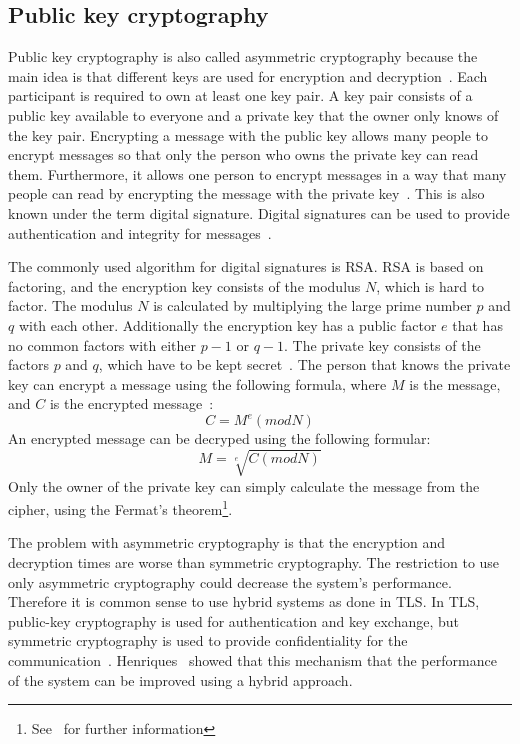 \subsection{Public key cryptography}
Public key cryptography is also called asymmetric cryptography because the main idea is that different keys are used for encryption and decryption~\cite{anderson2020security}.
Each participant is required to own at least one key pair.
A key pair consists of a public key available to everyone and a private key that the owner only knows of the key pair.
Encrypting a message with the public key allows many people to encrypt messages so that only the person who owns the private key can read them.
Furthermore, it allows one person to encrypt messages in a way that many people can read by encrypting the message with the private key~\cite{henriques2017using}.
This is also known under the term digital signature. 
Digital signatures can be used to provide authentication and integrity for messages~\cite{anderson2020security}.

The commonly used algorithm for digital signatures is RSA.
RSA is based on factoring, and the encryption key consists of the modulus $N$, which is hard to factor.
The modulus $N$ is calculated by multiplying the large prime number $p$ and $q$ with each other.
Additionally the encryption key has a public factor $e$ that has no common factors with either $p-1$ or $q-1$.
The private key consists of the factors $p$ and $q$, which have to be kept secret~\cite{anderson2020security}.
The person that knows the private key can encrypt a message using the following formula, where $M$ is the message, and $C$ is the encrypted message~\cite{anderson2020security}:
\begin{displaymath}
	C = M^e (mod N)
\end{displaymath}
An encrypted message can be decryped using the following formular:
\begin{displaymath}
	M = \sqrt[e]{C (mod N)}
\end{displaymath}
Only the owner of the private key can simply calculate the message from the cipher, using the Fermat's theorem\footnote{See~\cite{anderson2020security} for further information}.

The problem with asymmetric cryptography is that the encryption and decryption times are worse than symmetric cryptography.
The restriction to use only asymmetric cryptography could decrease the system's performance.
Therefore it is common sense to use hybrid systems as done in TLS.
In TLS, public-key cryptography is used for authentication and key exchange, but symmetric cryptography is used to provide confidentiality for the communication~\cite{henriques2017using}.
Henriques~\cite{henriques2017using} showed that this mechanism that the performance of the system can be improved using a hybrid approach.

